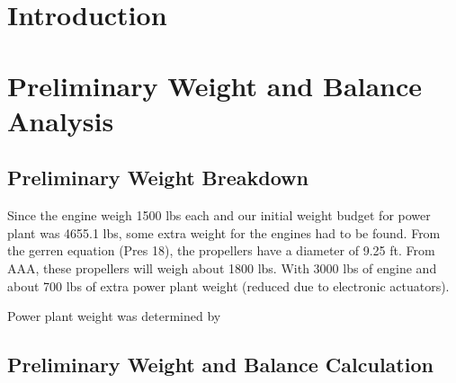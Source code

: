 \documentclass[conf]{new-aiaa}
\begin{document}
\section{Introduction}

\section{Preliminary Weight and Balance Analysis}
\subsection{Preliminary Weight Breakdown}
Since the engine weigh 1500 lbs each and our initial weight budget for power plant was 4655.1 lbs, some extra weight for the engines had to be found.
From the gerren equation (Pres 18), the propellers have a diameter of 9.25 ft. From AAA, these propellers will weigh about 1800 lbs. With 3000 lbs of engine and about 700 lbs of extra power plant weight (reduced due to electronic actuators).

Power plant weight was determined by 


\subsection{Preliminary Weight and Balance Calculation}
\end{document}
